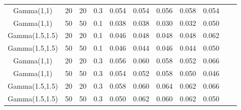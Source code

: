 \documentclass[11pt]{article}
\begin{document}
\begin{appendices}
\begin{table}[H]
{\begin{tabular}{ccccccccccc}
					
					\hline 
					Gamma(1,1) & 20 & 20 & 0.3  & 0.054 & 0.054 & 0.056 & 0.058 & 0.054 \\ 
					Gamma(1,1) & 50 & 50 & 0.1 & 0.038 & 0.038 & 0.030 & 0.032 & 0.050 \\ 
					Gamma(1.5,1.5) & 20 & 20 & 0.1   & 0.046 & 0.048 & 0.048 & 0.048 & 0.062 \\ 
					Gamma(1.5,1.5) & 50 & 50 & 0.1  & 0.046 & 0.044 & 0.046 & 0.044 & 0.050 \\ 
					Gamma(1,1) & 20 & 20 & 0.3 &  0.056 & 0.060 & 0.058 & 0.052 & 0.066 \\ 
					Gamma(1,1) & 50 & 50 & 0.3 & 0.054 & 0.052 & 0.058 & 0.050 & 0.046 \\ 
					Gamma(1.5,1.5) & 20 & 20 & 0.3  & 0.058 & 0.060 & 0.064 & 0.062 & 0.066 \\ 
					Gamma(1.5,1.5) & 50 & 50 & 0.3  & 0.050 & 0.062 & 0.060 & 0.062 & 0.050 \\ 
					
					\hline
				\end{tabular}} 
				
\end{table}
\end{appendices}
\end{document}
